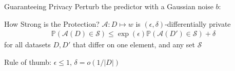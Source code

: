 \documentclass[aspectratio=169,14pt]{beamer}
\begin{document}
\begin{frame}[t]{Guaranteeing Privacy}
  Perturb the predictor with a Gaussian noise $b$:
\end{frame}


\begin{frame}{How Strong is the Protection?}
  $\mathcal{A} : D \mapsto w$ is $(\epsilon, \delta)$-differentially private
  \begin{align*}
    \mathbb{P}(\mathcal{A}(D) \in \mathcal{S})
    \le
    \exp(\epsilon)
    \mathbb{P}(\mathcal{A}(D') \in \mathcal{S})
    + \delta
  \end{align*}
  for all datasets $D, D'$ that differ on one element, and any set $\mathcal{S}$

  \vspace{1em}

  Rule of thumb: $\epsilon \le 1$, $\delta = o(1/|D|)$
\end{frame}
\end{document}
